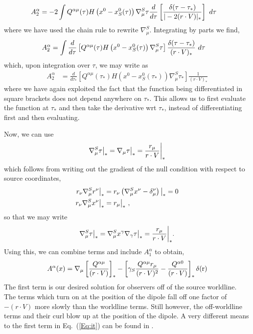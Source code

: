 \begin{widetext}
\begin{align}
 A_2^{\alpha} &= -2 \int 
  Q^{\alpha \mu}(\tau)  H \left( x^0  -  x^0_S(\tau) \right) \nabla^S_{\mu} \tau \frac{d}{d \tau} \left[  \frac{ \delta(\tau-\tau_*) }{ | -2( r \cdot V)|_{*} } \right]
 \hbox{ } d \tau 
\end{align}
where we have used the chain rule to rewrite $\nabla^S_{\mu}$. Integrating by parts we find,
\begin{align}
 A_2^{\alpha} &=  \int 
 \frac{d}{d \tau} \left[   Q^{\alpha \mu}(\tau)  H \left( x^0  -  x^0_S(\tau) \right) \nabla^S_{\mu} \tau  \right]   \frac{ \delta(\tau-\tau_*) }{ (r \cdot V)_* }
 \hbox{ } d \tau 
\end{align}
which, upon integration over $\tau$, we may write as 
\begin{align}
 A_2^{\alpha} &=  
 \frac{d}{d \tau_*} \left[   Q^{\alpha \mu}(\tau_*)  H \left( x^0  -  x^0_S(\tau_*) \right) \nabla^S_{\mu} \tau_*  \right]   \frac{ 1 }{ (r \cdot V)_* }
\end{align}
where we have again exploited the fact that the function being
differentiated in square brackets does not depend anywhere on
$\tau_*$. This allows us to first evaluate the function at $\tau_*$
and then take the derivative wrt $\tau_*$, instead of differentiating
first and then evaluating.

Now, we can use
\begin{align}
\nabla_\mu^{S} \tau  \big{|}_* = \nabla_\mu \tau  \big{|}_* = \frac{r_{\mu}}{ r \cdot V }  \bigg{|}_*
\label{AppA:GradTau*}
\end{align}
which follows from writing out the gradient of the null condition with respect to source coordinates,
\begin{align}
r_{\nu}\nabla_\mu^{S} r^{\nu}  \big{|}_* &= r_{\nu}  \left(  \nabla_\mu^{S} x^{\nu}  - \delta^{\nu}_{\mu} \right)\big{|}_*  = 0 \nonumber \\
 r_{\nu}\nabla_\mu^{S} x^{\nu}  \big{|}_* &= r_{\mu} \big{|}_* \ ,
\end{align}
so that we may write
\begin{align}
\nabla_\mu^{S} \tau\big{|}_* = \nabla_\mu^{S} x^{\gamma} \nabla_{\gamma} \tau  \big{|}_* = \frac{r_{\mu}}{ r \cdot V }  \bigg{|}_*.
\end{align}
Using this, 
we can combine terms
and include $A_1^{\alpha} $ to obtain,
\begin{align}
A^{\alpha}(x) = \nabla_{\mu} \left[ \frac{Q^{\alpha \mu} }{(r \cdot
    V)} \right]_* -  \left[ \gamma_S \frac{Q^{\alpha \mu} r_{\mu}}{(r
    \cdot V)^2}  - \frac{Q^{\alpha 0} }{\left( r \cdot V \right)}
  \right]_*  \delta(\hbox{r})
\label{Eq:it}
\end{align}
The first term is our desired solution for observers off of the source worldline.  The terms which turn on at the position of the dipole fall off one factor of $-(r \cdot V)$ more slowly than the worldline terms. Still however, the off-worldline terms and their curl blow up at the position of the dipole. 
A very different means to the first term in Eq.\  (\ref{Eq:it}) can be found
in \cite{Rowe2:1986}.


\end{widetext}
